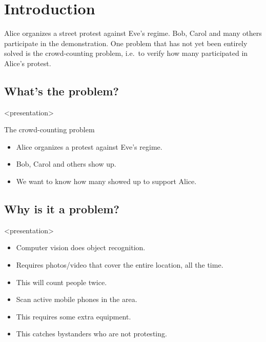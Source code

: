 \mode*

\section{Introduction}
\label{Introduction}

Alice organizes a street protest against Eve's regime.
Bob, Carol and many others participate in the demonstration.
One problem that has not yet been entirely solved is the crowd-counting 
problem, i.e.\ to verify how many participated in Alice's protest.

\subsection<presentation>{What's the problem?}

\begin{frame}<presentation>
  \begin{block}{The crowd-counting problem}
    \begin{itemize}
      \item Alice organizes a protest against Eve's regime.
      \item Bob, Carol and others show up.
      \item We want to know how many showed up to support Alice.
    \end{itemize}
  \end{block}
\end{frame}

\subsection<presentation>{Why is it a problem?}

\begin{frame}<presentation>
  \begin{example}
    \begin{itemize}
      \item Computer vision does object recognition.
      \item Requires photos/video that cover the entire location, all the time.
      \item This will count people twice.
    \end{itemize}
  \end{example}

  \pause

  \begin{example}
    \begin{itemize}
      \item Scan active mobile phones in the area.
      \item This requires some extra equipment.
      \item This catches bystanders who are not protesting.
    \end{itemize}
  \end{example}
\end{frame}

